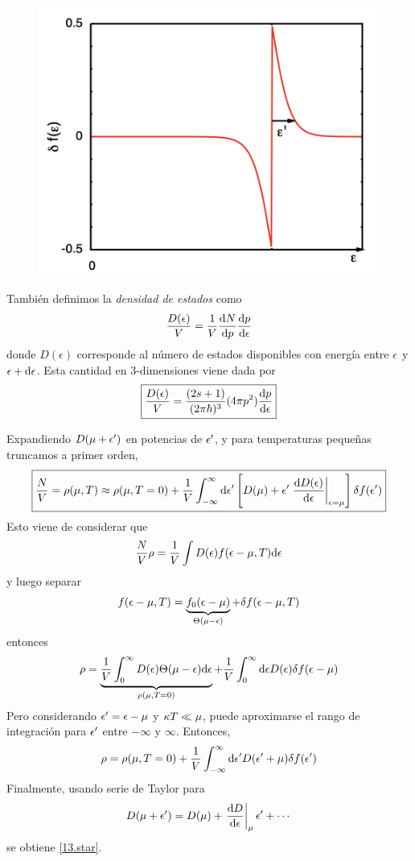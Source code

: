 \begin{figure}[h!]
	\centering
	\includegraphics[scale=0.5]{fig/im2.png}
\end{figure}

También definimos la \textit{densidad de estados} como
\begin{equation}
  \frac{D(\epsilon)}{V}=\frac{1}{V}\dv{N}{p}\dv{p}{\epsilon}
\end{equation}
donde $D(\epsilon)$ corresponde al número de estados disponibles con energía entre $\epsilon$ y $\epsilon+\dd \epsilon$. Esta cantidad en $3$-dimensiones viene dada por
\begin{equation}
 \boxed{ \frac{D(\epsilon)}{V}=\frac{(2s+1)}{(2\pi\hbar)^3}(4\pi p^2)\dv{p}{\epsilon}}
\end{equation}

Expandiendo $D(\mu+\epsilon')$ en potencias de $\epsilon'$, y para temperaturas pequeñas truncamos a primer orden,
\begin{equation}\label{13.star}
  \boxed{\frac{N}{V}=\r(\m,T)\approx \r(\m,T=0)+\frac{1}{V}\int_{-\infty}^\infty \dd\ep'\left[D(\m )+\ep'\eval{\dv{D(\ep)}{\epsilon}}_{\ep=\m }\right]\d f(\ep ')}
\end{equation}
Esto viene de considerar que
\begin{equation}
  \frac{N}{V}\rho=\frac{1}{V}\int D(\epsilon )f(\epsilon-\mu,T)\dd\epsilon
\end{equation}
y luego separar
\begin{equation}
  f(\epsilon-\mu,T)=\underbrace{f_0(\epsilon-\mu )}_{\Theta (\mu-\epsilon)}+\delta f(\epsilon-\mu,T)
\end{equation}
entonces
\begin{equation}
  \rho=\underbrace{\frac{1}{V}\int_0^\infty D(\epsilon )\Theta(\mu-\epsilon)\dd\epsilon}_{\rho(\mu,T=0)}+\frac{1}{V}\int_0^\infty\dd\epsilon D(\epsilon )\delta f(\epsilon-\mu )
\end{equation}
Pero considerando $\epsilon'=\epsilon-\mu$ y $\kappa T\ll \mu $, puede aproximarse el rango de integración para $\epsilon'$ entre $-\infty$ y $\infty$. Entonces,
\begin{equation}
  \rho=\rho(\mu,T=0)+\frac{1}{V}\int_{-\infty}^\infty \dd\epsilon' D(\epsilon'+\mu )\delta f(\epsilon ')
\end{equation}
Finalmente, usando serie de Taylor para $$D(\m+\ep')=D(\m )+\eval{\dv{D}{\ep }}_\m \ep'+\cdots $$ se obtiene \eqref{13.star}.


